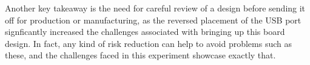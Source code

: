 \documentclass{article}
\newcommand*{\Indent}{\hspace*{1cm}}
\begin{document}
\Indent Another key takeaway is the need for careful review of a design before sending it off for production or manufacturing, as the reversed placement of the USB port signficantly increased the challenges associated with bringing up this board design. In fact, any kind of risk reduction can help to avoid problems such as these, and the challenges faced in this experiment showcase exactly that.
\end{document}
